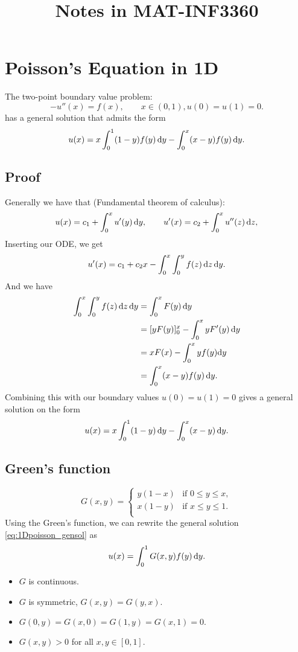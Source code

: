 \documentclass[a4paper, 11pt, notitlepage, english]{article}
\author{}
\title{Notes in MAT-INF3360}
\newcommand{\beq}{\begin{equation}}
\newcommand{\eeq}{\end{equation}}
\renewcommand{\d}{{\rm d}}
\begin{document}
\section{Poisson's Equation in 1D}
The two-point boundary value problem:
$$-u''(x) = f(x), \qquad x\in(0,1), u(0) = u(1) = 0.$$
has a general solution that admits the form
\beq
u(x) = x\int_0^1 (1-y)f(y) \, \d y - \int_0^x (x-y) f(y) \, \d y.
\label{eq:1Dpoisson_gensol}
\eeq

\subsection{Proof}
Generally we have that (Fundamental theorem of calculus):
$$u(x) = c_1 + \int_0^x u'(y) \, \d y, \qquad u'(x) = c_2 + \int_0^x u''(z) \, \d z,$$
Inserting our ODE, we get
$$u'(x) = c_1 + c_2 x - \int_0^x \int_0^y f(z) \, \d z \, \d y.$$
And we have
\begin{align*}
\int_0^x \int_0^y f(z) \, \d z \, \d y &= \int_0^x F(y) \, \d y \\
&= [yF(y)]^x_0 - \int_0^x yF'(y) \, \d y \\
&= xF(x) - \int_0^x yf(y) \d y \\
&= \int_0^x (x-y)f(y) \, \d y.
\end{align*}
Combining this with our boundary values $u(0)=u(1)=0$ gives a general solution on the form
$$u(x) = x\int_0^1(1-y)\, \d y - \int_0^x (x-y)\, \d y.$$

\subsection{Green's function}
\beq
G(x,y) = \begin{cases}
y(1-x) & \mbox{if } 0\leq y \leq x, \\
x(1-y) & \mbox{if }  x\leq y \leq 1. \\
\end{cases}
\eeq
Using the Green's function, we can rewrite the general solution \ref{eq:1Dpoisson_gensol} as
\beq
u(x) \texttt{}= \int_0^1 G(x,y)f(y) \, \d y. \label{eq:green_sol}
\eeq

\begin{itemize}
\item $G$ is continuous.
\item $G$ is symmetric, $G(x,y)=G(y,x).$
\item $G(0,y)=G(x,0)=G(1,y)=G(x,1) = 0.$
\item $G(x,y)>0$ for all $x,y\in[0,1].$
\end{itemize}
\end{document}
